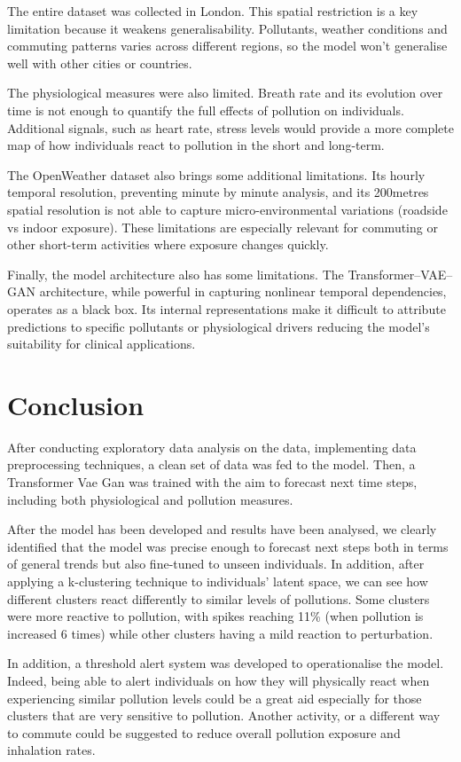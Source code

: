 \documentclass[12pt,a4paper]{report}
\begin{document}
The entire dataset was collected in London. This spatial restriction is
a key limitation because it weakens generalisability. Pollutants,
weather conditions and commuting patterns varies across different
regions, so the model won't generalise well with other cities or
countries.

The physiological measures were also limited. Breath rate and its
evolution over time is not enough to quantify the full effects of
pollution on individuals. Additional signals, such as heart rate, stress
levels would provide a more complete map of how individuals react to
pollution in the short and long-term.

The OpenWeather dataset also brings some additional limitations. Its
hourly temporal resolution, preventing minute by minute analysis, and
its 200metres spatial resolution is not able to capture
micro-environmental variations (roadside vs indoor exposure). These
limitations are especially relevant for commuting or other short-term
activities where exposure changes quickly.

Finally, the model architecture also has some limitations. The
Transformer--VAE--GAN architecture, while powerful in capturing
nonlinear temporal dependencies, operates as a black box. Its internal
representations make it difficult to attribute predictions to specific
pollutants or physiological drivers
reducing the model's suitability for clinical applications.

\chapter{Conclusion}
After conducting exploratory data analysis on the data, implementing
data preprocessing techniques, a clean set of data was fed to the model.
Then, a Transformer Vae Gan was trained with the aim to forecast next
time steps, including both physiological and pollution measures.

After the model has been developed and results have been
analysed, we clearly identified that the model was precise enough to
forecast next steps both in terms of general trends but also fine-tuned
to unseen individuals. In addition, after applying a k-clustering
technique to individuals' latent space, we can see how different
clusters react differently to similar levels of pollutions. Some clusters were more reactive to pollution, with spikes reaching 11\%
(when pollution is increased 6 times) while other clusters having a mild
reaction to perturbation.

In addition, a threshold alert system was developed to operationalise
the model. Indeed, being able to alert individuals on how they will
physically react when experiencing similar pollution levels could be a
great aid especially for those clusters that are very sensitive to
pollution. Another activity, or a different way to commute could be
suggested to reduce overall pollution exposure and inhalation rates.
\end{document}
